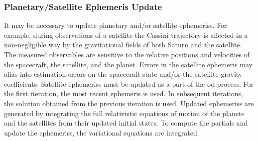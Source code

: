 \documentclass{article}
\begin{document}
                \subsubsection{%
                    \footnotesize{Planetary/Satellite Ephemeris Update}
                }
                    It may be necessary to update planetary
                    and/or satellite \glspl{ephemeris}.
                    For example, during observations of a satellite
                    the Cassini trajectory is affected in a
                    non-negligible way by the
                    \glspl{gravitational field} of both Saturn and
                    the satellite. The measured observables are
                    sensitive to the relative positions and
                    velocities of the spacecraft, the satellite,
                    and the planet. Errors in the satellite
                    \gls{ephemeris} may alias into estimation
                    errors on the spacecraft state and/or the
                    satellite gravity coefficients. Satellite
                    \glspl{ephemeris} must be updated as a part
                    of the \gls{od} process. For the first iteration,
                    the most recent \gls{ephemeris} is used. In
                    subsequent iterations, the solution obtained
                    from the previous iteration is used. Updated
                    \glspl{ephemeris} are generated by integrating
                    the full relativistic \gls{equations of motion}
                    of the planets and the satellites from their
                    updated initial states. To compute the partials
                    and update the \glspl{ephemeris}, the
                    \glspl{variational equation} are integrated.
\end{document}
